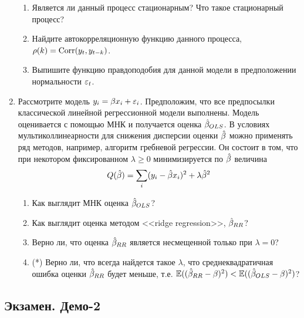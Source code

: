 \documentclass[12pt, a4paper]{article}\usepackage[]{graphicx}\usepackage[]{color}
\begin{document}
\begin{enumerate}
\begin{enumerate}
\item Является ли данный процесс стационарным? Что такое стационарный процесс?
\item Найдите автокорреляционную функцию данного процесса, $\rho(k)=\operatorname{Corr}(y_t,y_{t-k})$.
\item Выпишите функцию правдоподобия для данной модели в предположении нормальности $\varepsilon_t$.
\end{enumerate}



\item Рассмотрите модель $y_i=\beta x_i+\varepsilon_i$. Предположим, что все предпосылки классической линейной регрессионной модели выполнены. Модель оценивается с помощью МНК и получается оценка $\hat{\beta}_{OLS}$.
В условиях мультиколлинеарности для снижения дисперсии оценки $\hat{\beta}$ можно применять ряд методов, например, алгоритм гребневой регрессии. Он состоит в том, что при некотором фиксированном $\lambda\geq 0$ минимизируется по $\hat{\beta}$ величина
\[
Q(\hat{\beta})=\sum_i (y_i-\hat{\beta} x_i)^2+\lambda \hat{\beta}^2
\]
\begin{enumerate}
\item Как выглядит МНК оценка $\hat{\beta}_{OLS}$?
\item Как выглядит оценка методом <<ridge regression>>, $\hat{\beta}_{RR}$?
\item Верно ли, что оценка $\hat{\beta}_{RR}$ является несмещенной только при $\lambda=0$?
\item (*) Верно ли, что всегда найдется такое $\lambda$, что среднеквадратичная ошибка оценки $\hat{\beta}_{RR}$ будет меньше, т.е. $\mathbb{E}((\hat{\beta}_{RR}-\beta)^2)<\mathbb{E}((\hat{\beta}_{OLS}-\beta)^2)$?
\end{enumerate}


\end{enumerate}


\subsection{Экзамен. Демо-2}
\end{document}
